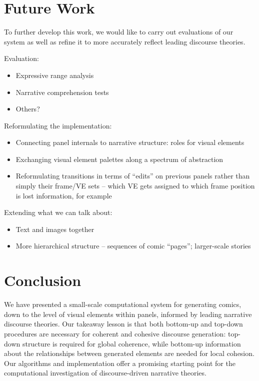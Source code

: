 \section{Future Work}

To further develop this work, we would like to carry out evaluations of our
system as well as refine it to more accurately reflect leading discourse
theories.

Evaluation:
\begin{itemize}
\item Expressive range analysis~\cite{smith2010analyzing}
\item Narrative comprehension tests
\item Others?
\end{itemize}

Reformulating the implementation:

\begin{itemize}
\item Connecting panel internals to narrative structure: roles for visual
elements
\item Exchanging visual element palettes along a spectrum of abstraction
\item Reformulating transitions in terms of ``edits'' on previous panels
rather than simply their frame/VE sets -- which VE gets assigned to which
frame position is lost information, for example
\end{itemize}

Extending what we can talk about:
\begin{itemize}
\item Text and images together
\item More hierarchical structure -- sequences of comic ``pages'';
larger-scale stories
\end{itemize}


\section{Conclusion}

We have presented a small-scale computational system for generating comics,
down to the level of visual elements within panels, informed by leading
narrative discourse theories.
Our takeaway lesson is that both bottom-up and top-down procedures are
necessary for coherent and cohesive discourse generation: top-down
structure is required for global coherence, while bottom-up information
about the relationships between generated elements are needed for local
cohesion. Our algorithms and implementation offer a promising starting
point for the computational investigation of discourse-driven narrative
theories.




